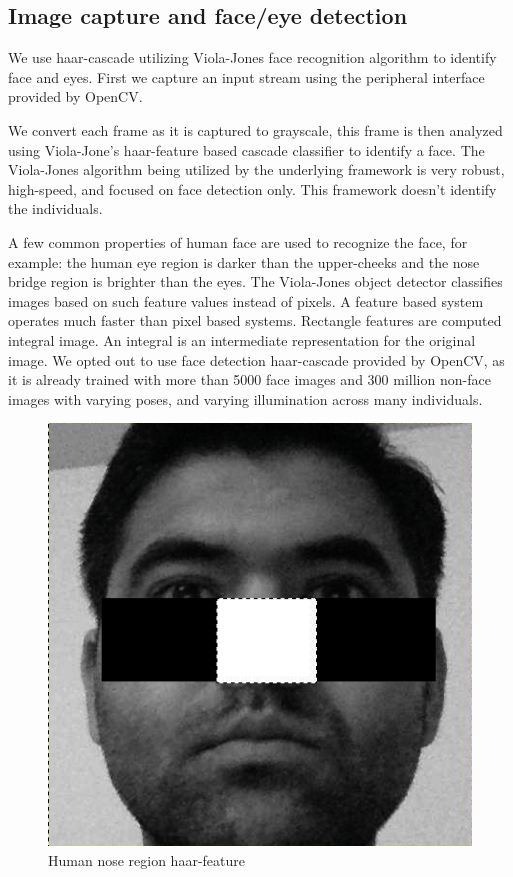 \documentclass[10pt,twocolumn,letterpaper]{article}
\begin{document}
\subsection{Image capture and face/eye detection}
We use haar-cascade utilizing Viola-Jones face recognition algorithm to 
identify face and eyes. First we capture an input stream using the peripheral
interface provided by OpenCV. 

We convert each frame as it is captured to grayscale, this frame is then analyzed 
using Viola-Jone's haar-feature based cascade classifier to identify a face.  
The Viola-Jones algorithm being utilized by the underlying framework is very robust, 
high-speed, and focused on face detection only. This framework doesn't 
identify the individuals. 

A few common properties of human face are used to recognize the face, for example: the human eye region is darker than the upper-cheeks and the nose bridge region is brighter than the eyes. The Viola-Jones object detector classifies images based on such feature values instead of pixels.  A feature based system operates much faster than pixel based systems. Rectangle features are computed integral image. An integral is an intermediate representation for the original image. 
We opted out to use face detection haar-cascade provided by OpenCV, as it is already trained with more than 5000 face images and 300 million non-face images with varying poses, and varying illumination across many individuals. 

\begin{figure}
  \begin{center}
    \includegraphics[width=\linewidth]{nose}
  \end{center}
  \caption{Human nose region haar-feature}
  \label{fig:human_nose}
\end{figure}
\end{document}

